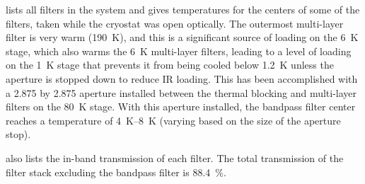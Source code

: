  lists all filters in the system and gives temperatures for the centers of some of the filters, taken while the cryostat was open optically.
The outermost multi-layer filter is very warm (\SI{190}{\K}), and this is a significant source of loading on the \SI{6}{\K} stage, which also warms the \SI{6}{\K} multi-layer filters, leading to a level of loading on the \SI{1}{\K} stage that prevents it from being cooled below \SI{1.2}{\K} unless the aperture is stopped down to reduce IR loading.
This has been accomplished with a \SI{2.875}{\in} by \SI{2.875}{\in} aperture installed between the thermal blocking and multi-layer filters on the \SI{80}{\K} stage.
With this aperture installed, the bandpass filter center reaches a temperature of \SIrange{4}{8}{\K} (varying based on the size of the aperture stop).

 also lists the in-band transmission of each filter.
The total transmission of the filter stack excluding the bandpass filter is \SI{88.4}{\percent}.

